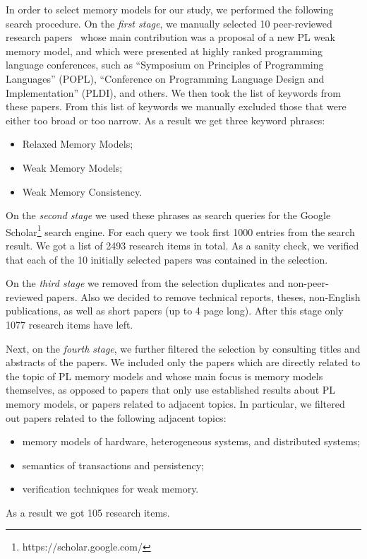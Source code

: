 In order to select memory models for our study, 
we performed the following search procedure.
On the \emph{first stage}, we manually selected 10  
peer-reviewed research papers~\cite{
Manson-al:POPL05,
Batty-al:POPL11,
Lahav-al:PLDI17,
Dolan-al:PLDI18,
Watt-al:PLDI2020,
Jeffrey-Riely:LICS16,
PichonPharabod-Sewell:POPL16,
Kang-al:POPL17,
Chakraborty-Vafeiadis:POPL19,
Paviotti-al:ESOP20
}
whose main contribution was a proposal of a new PL weak memory model, 
and which were presented at highly ranked programming language conferences, 
such as ``Symposium on Principles of Programming Languages'' (POPL),
``Conference on Programming Language Design and Implementation'' (PLDI), and others.
We then took the list of keywords from these papers. 
From this list of keywords we manually excluded those 
that were either too broad or too narrow.
As a result we get three keyword phrases:
\begin{itemize}
  \item Relaxed Memory Models;
  \item Weak Memory Models;
  \item Weak Memory Consistency.
\end{itemize}
 
On the \emph{second stage} we used these phrases as search queries
for the Google Scholar\footnote{https://scholar.google.com/} search engine.
For each query we took first 1000 entries from the search result.
We got a list of 2493 research items in total. 
As a sanity check, we verified that each of the 10 initially 
selected papers was contained in the selection. 

On the \emph{third stage} we removed from the selection duplicates
and non-peer-reviewed papers. 
Also we decided to remove technical reports, theses, 
non-English publications, as well as short papers (up to 4 page long).
After this stage only 1077 research items have left.

Next, on the \emph{fourth stage}, we further filtered the selection 
by consulting titles and abstracts of the papers. 
We included only the papers which are directly related to the 
topic of PL memory models and whose main focus is memory models themselves,
as opposed to papers that only use established results about PL memory models,
or papers related to adjacent topics. 
In particular, we filtered out papers related to the following adjacent topics:
\begin{itemize}
  \item memory models of hardware, heterogeneous systems, and distributed systems;
  \item semantics of transactions and persistency;
  \item verification techniques for weak memory.
\end{itemize}
As a result we got 105 research items.


